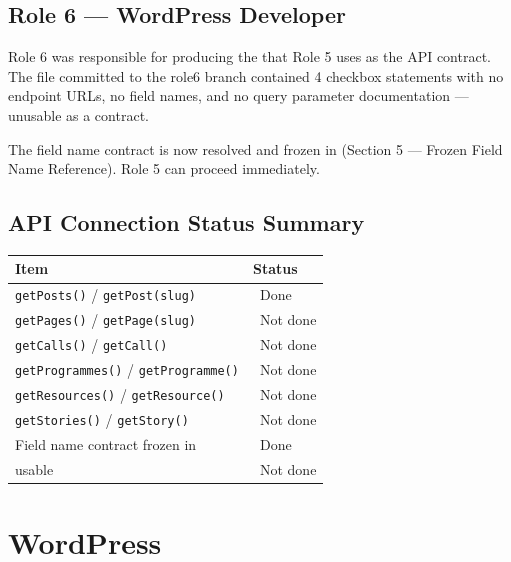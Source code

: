 \documentclass[12pt,a4paper]{article}
\newcommand{\done}{\textcolor{statusGreen}{\faCheckCircle\ Done}}
\newcommand{\missing}{\textcolor{statusRed}{\faTimes\ Not done}}
\begin{document}
\subsection{Role 6 --- WordPress Developer}

Role 6 was responsible for producing the 
that Role 5 uses as the API contract. The file committed to the role6 branch
contained 4 checkbox statements with no endpoint URLs, no field names, and no
query parameter documentation --- unusable as a contract.

The field name contract is now resolved and frozen in
 (Section 5 ---
Frozen Field Name Reference). Role 5 can proceed immediately.

\subsection{API Connection Status Summary}

\begin{longtable}{@{}L{9.5cm}L{3.7cm}@{}}
\toprule
{}
\textbf{Item} & \textbf{Status} \\
\midrule
\endhead
\texttt{getPosts()} / \texttt{getPost(slug)} & \done \\
\addlinespace
\texttt{getPages()} / \texttt{getPage(slug)} & \missing \\
\addlinespace
\texttt{getCalls()} / \texttt{getCall()} & \missing \\
\addlinespace
\texttt{getProgrammes()} / \texttt{getProgramme()} & \missing \\
\addlinespace
\texttt{getResources()} / \texttt{getResource()} & \missing \\
\addlinespace
\texttt{getStories()} / \texttt{getStory()} & \missing \\
\addlinespace
Field name contract frozen in  & \done \\
\addlinespace
{} usable & \missing \\
\bottomrule
\end{longtable}

\newpage

\section{WordPress}
\end{document}
